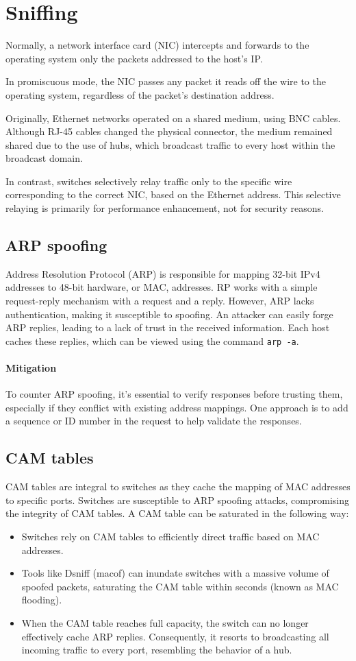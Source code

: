 \section{Sniffing}

Normally, a network interface card (NIC) intercepts and forwards to the operating system only the packets addressed to the host's IP.

In promiscuous mode, the NIC passes any packet it reads off the wire to the operating system, regardless of the packet's destination address.

Originally, Ethernet networks operated on a shared medium, using BNC cables. 
Although RJ-45 cables changed the physical connector, the medium remained shared due to the use of hubs, which broadcast traffic to every host within the broadcast domain.

In contrast, switches selectively relay traffic only to the specific wire corresponding to the correct NIC, based on the Ethernet address. 
This selective relaying is primarily for performance enhancement, not for security reasons.

\subsection{ARP spoofing}
Address Resolution Protocol (ARP) is responsible for mapping 32-bit IPv4 addresses to 48-bit hardware, or MAC, addresses.
RP works with a simple request-reply mechanism with a request and a reply. 
However, ARP lacks authentication, making it susceptible to spoofing. 
An attacker can easily forge ARP replies, leading to a lack of trust in the received information. 
Each host caches these replies, which can be viewed using the command \texttt{arp -a}.
\paragraph*{Mitigation}
To counter ARP spoofing, it's essential to verify responses before trusting them, especially if they conflict with existing address mappings. 
One approach is to add a sequence or ID number in the request to help validate the responses.

\subsection{CAM tables}
CAM tables are integral to switches as they cache the mapping of MAC addresses to specific ports.
Switches are susceptible to ARP spoofing attacks, compromising the integrity of CAM tables.
A CAM table can be saturated in the following way: 
\begin{itemize}
    \item Switches rely on CAM tables to efficiently direct traffic based on MAC addresses.
    \item Tools like Dsniff (macof) can inundate switches with a massive volume of spoofed packets, saturating the CAM table within seconds (known as MAC flooding).
    \item When the CAM table reaches full capacity, the switch can no longer effectively cache ARP replies. 
        Consequently, it resorts to broadcasting all incoming traffic to every port, resembling the behavior of a hub.
\end{itemize}
